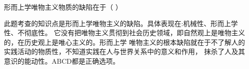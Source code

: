 \question 形而上学唯物主义物质的缺陷在于（ ）
\par\fourch{\textcolor{red}{把质上无限多样的物质世界归结为粒子在量上的不同}}{\textcolor{red}{把某种特殊的物质形态误认为物质的一般特征}}{\textcolor{red}{不了解人类对物质的认识是一个永无止境的发展过程}}{\textcolor{red}{割裂了自然界与人类社会的物质统一性}}
\begin{solution}此题考查的知识点是形而上学唯物主义的缺陷。具体表现在:机械性、形而上学性、不彻底性。
它没有把唯物主义贯彻到社会历史领域，即自然观上是唯物主义的，在历史观上是唯心主义的。形而上学
唯物主义的根本缺陷就在于不了解人的实践活动的物质性，不知道实践在人与世界关系中的意义和作用，
抹杀了人及其意识的能动性。ABCD都是正确选项。
\end{solution}
